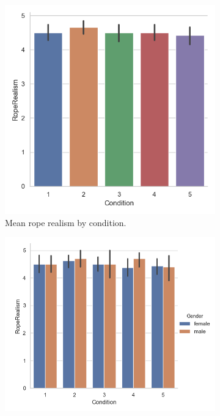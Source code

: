 
\begin{figure}[H]
 \begin{subfigure}[b]{0.5\textwidth}
     \centering
     \includegraphics[scale=0.5]{Files/Plots/ropeRealism_by_condition.png}
     \caption{Mean rope realism by condition.}
     \label{fig:ropeRealCond}
 \end{subfigure}
  \begin{subfigure}[b]{0.5\textwidth}
     \centering
     \includegraphics[scale=0.5]{Files/Plots/ropeRealism_by_condition_gen.png}

\end{subfigure}
\end{figure}
